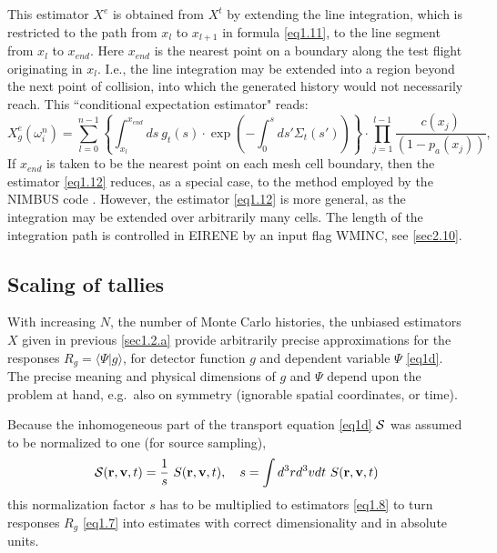 This estimator $ X^e$ is obtained from $ X^t$ by extending the line
integration, which is restricted to the path from $ x_l$ to $ x_{l+1}$ in
formula \cref{eq1.11}, to the line segment from $ x_l$ to $ x_{end}$.
Here $ x_{end}$ is the nearest point on a boundary along the test flight
originating in $ x_l$.
I.e., the line integration may be extended into a region beyond the next point
of collision, into which the generated history would not necessarily reach.
This ``conditional expectation estimator" reads:
\begin{equation}
  \label{eq1.12}
  X^e_g ( \omega^n_i ) = \sum_{l=0}^{n-1}  \left \{\int_{x_l}^{x_{end}} ds \ g_t
  (s)    \cdot   \exp \left ( - \int_{0}^{s} ds '   \Sigma_t ( s ' ) \right )
  \right \} \cdot   \prod_{j=1}^{l-1} \frac{c(x_j )}{(1 - p_a(x_j))},
\end{equation}
If $ x_{end}$ is taken to be the nearest point on each mesh cell
boundary, then the estimator \cref{eq1.12} reduces, as a special case, to the
method employed by the NIMBUS code \cite{kn:Cupini}.
However, the estimator \cref{eq1.12} is more general, as the integration may be
extended over arbitrarily many cells.
The length of the integration path is controlled in EIRENE by an input flag
WMINC, see \cref{sec2.10}.

\subsection{Scaling of tallies}\label{sec1.2.0}

With increasing $N$, the number of Monte Carlo histories, the unbiased
estimators $X$ given in previous \cref{sec1.2.a} provide arbitrarily precise
approximations for the responses $R_g=\langle\Psi|g\rangle$, for detector
function $g$ and dependent variable $\Psi$ \cref{eq1d}.
The precise meaning and physical dimensions of $g$ and $\Psi$ depend upon the
problem at hand, e.g.\ also on symmetry (ignorable spatial coordinates, or
time).

Because the inhomogeneous part of the transport equation \cref{eq1d} $\cal{S}$
was assumed to be normalized to one (for source sampling),
\begin{equation}
  \label{scale} {\cal{S}} (\mathbf{r},\mathbf{v},t)=\frac{1}{s} \ S(\mathbf{r},\mathbf{v},t), \quad  s =\int
  d^3rd^3vdt\ S(\mathbf{r},\mathbf{v},t)
\end{equation}
this normalization factor $s$ has to be
multiplied to estimators \cref{eq1.8} to turn responses $R_g$ \cref{eq1.7} into
estimates with correct dimensionality and in absolute units.

